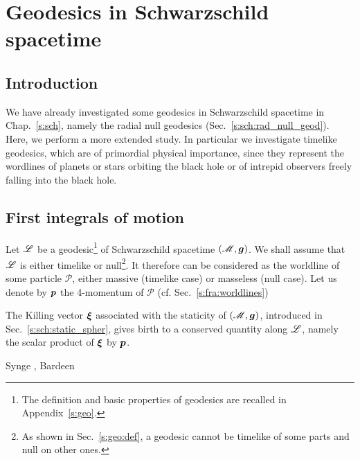 \chapter{Geodesics in Schwarzschild spacetime}
\label{s:ges}

\minitoc

\section{Introduction}

We have already investigated some geodesics in Schwarzschild spacetime in
Chap.~\ref{s:sch}, namely
the radial null geodesics (Sec.~\ref{s:sch:rad_null_geod}).
Here, we perform a more extended study. In particular we investigate timelike
geodesics, which are of primordial physical importance, since they represent
the wordlines of planets or stars orbiting the black hole or of
intrepid observers freely falling into the black hole.

\section{First integrals of motion}

Let $\mathscr{L}$ be a geodesic\footnote{The definition and basic properties of geodesics
are recalled in Appendix~\ref{s:geo}.} of Schwarzschild spacetime
$(\mathscr{M},\bm{g})$. We shall assume that $\mathscr{L}$ is either timelike or null\footnote{As
shown in Sec.~\ref{s:geo:def}, a geodesic cannot be timelike of some parts
and null on other ones.}. It therefore can be considered as the worldline
of some particle $\mathscr{P}$, either massive
(timelike case) or masseless (null case).
Let us denote by $\bm{p}$ the 4-momentum of $\mathscr{P}$ (cf. Sec.~\ref{s:fra:worldlines})

The Killing vector $\bm{\xi}$ associated with the staticity
of $(\mathscr{M},\bm{g})$, introduced in Sec.~\ref{s:sch:static_spher}, gives birth
to a conserved quantity along $\mathscr{L}$, namely the scalar product of $\bm{\xi}$
by $\bm{p}$.



\begin{hist}
Synge \cite{Synge66}, Bardeen \cite{Barde73}
\end{hist}

